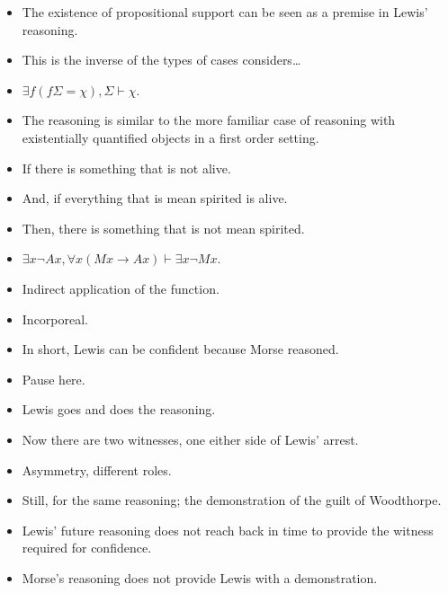 \documentclass[10pt]{article}
\newcommand{\hozlinedash}[0]{%
  \noindent\hdashrule[0.5ex][c]{\textwidth}{.1pt}{2.5pt}
}
\begin{document}
\hozlinedash

\begin{itemize}
\item The existence of propositional support can be seen as a premise in Lewis' reasoning.
\item {\color{red} This is the inverse of the types of cases \citeauthor{Worsnip:2018aa} considers\dots}
\item \(\exists f(f\Sigma = \chi), \Sigma \vdash \chi\).
\item The reasoning is similar to the more familiar case of reasoning with existentially quantified objects in a first order setting.
\item If there is something that is not alive.
\item And, if everything that is mean spirited is alive.
\item Then, there is something that is not mean spirited.
\item \(\exists x \lnot Ax, \forall x (Mx \rightarrow Ax) \vdash \exists x \lnot Mx\).
\end{itemize}

\begin{itemize}
\item Indirect application of the function.
\item Incorporeal.
\end{itemize}

\begin{itemize}
\item In short, Lewis can be confident because Morse reasoned.
\end{itemize}

\begin{itemize}
\item Pause here.
\end{itemize}

\hozlinedash

\begin{itemize}
\item Lewis goes and does the reasoning.
\item Now there are two witnesses, one either side of Lewis' arrest.
\item Asymmetry, different roles.
\item Still, for the same reasoning; the demonstration of the guilt of Woodthorpe.
\item Lewis' future reasoning does not reach back in time to provide the witness required for confidence.
\item Morse's reasoning does not provide Lewis with a demonstration.
\end{itemize}
\end{document}
